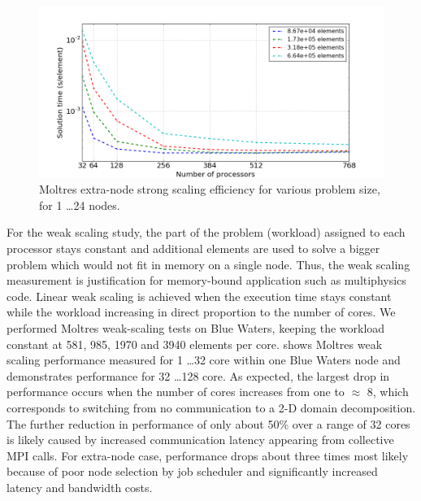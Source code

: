 \documentclass{article}
\makeatletter
\def\maxwidth#1{\ifdim\Gin@nat@width>#1 #1\else\Gin@nat@width\fi}
\makeatother
\begin{document}
\begin{figure}[htpb]
  \centering
  \includegraphics[width=\maxwidth{\textwidth}]{extra-node_strong.png}
  \caption{Moltres extra-node strong scaling efficiency for various problem size, for 1 \ldots 24 nodes.}
  \label{fig:extra_strong_scaling}
\end{figure}

For the weak scaling study, the part of the problem (workload) assigned to each processor stays constant and additional elements are 
used to solve a bigger problem which would not fit in memory on a single node. Thus, the weak scaling measurement is justification
 for memory-bound application such as multiphysics code. Linear weak scaling is achieved when the execution time stays constant 
 while the workload increasing in direct proportion to the number of cores. We performed Moltres weak-scaling tests on Blue Waters, 
 keeping the workload constant at 581, 985, 1970 and 3940 elements per core.  shows Moltres weak scaling 
performance measured for 1 \ldots 32 core within one Blue Waters node and  demonstrates performance for 
32 \ldots 128 core. As expected, the largest drop in performance occurs when the number of cores increases from one to $\approx$ 8, which 
corresponds to switching from no communication to a 2-D domain decomposition. The further reduction in performance of only about 50\% over 
a range of 32 cores is likely caused by increased communication latency appearing from collective MPI calls. For extra-node case, performance
 drops about three times most likely because of poor node selection by job scheduler and significantly increased latency and bandwidth costs.
\end{document}
